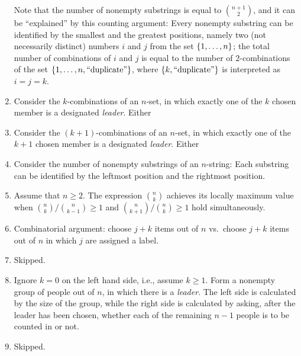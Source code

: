 \begin{enumerate}[\thesection-1]
Note that the number of nonempty substrings is equal to ${n + 1 \choose 2}$, and it can be ``explained'' by this counting argument: Every nonempty substring can be identified by the smallest and the greatest positions, namely two (not necessarily distinct) numbers $i$ and $j$ from the set $\left\{1, \ldots, n\right\}$; the total number of combinations of $i$ and $j$ is equal to the number of $2$-combinations of the set $\left\{1, \ldots, n, \mbox{``duplicate''}\right\}$, where $\left\{k, \mbox{``duplicate''}\right\}$ is interpreted as $i = j = k$.
%
\setcounter{enumi}{4}
%
\item Consider the $k$-combinations of an $n$-set, in which exactly one of the $k$ chosen member is a designated \emph{leader}. Either
%
\item Consider the $(k + 1)$-combinations of an $n$-set, in which exactly one of the $k + 1$ chosen member is a designated \emph{leader}. Either
%
\setcounter{enumi}{8}
%
\item Consider the number of nonempty substrings of an $n$-string: Each substring can be identified by the leftmost position and the rightmost position.
%
\item Assume that $n \geq 2$. The expression ${n \choose k}$ achieves its locally maximum value when ${n \choose k} / {n \choose k - 1} \geq 1$ and ${n \choose k + 1} / {n \choose k} \geq 1$ hold simultaneously.
%
\item Combinatorial argument: choose $j + k$ items out of $n$ vs.~choose $j + k$ items out of $n$ in which $j$ are assigned a label.
%
\item Skipped.
%
\setcounter{enumi}{14}
%
\item Ignore $k = 0$ on the left hand side, i.e., assume $k \geq 1$. Form a nonempty group of people out of $n$, in which there is a \emph{leader}. The left side is calculated by the size of the group, while the right side is calculated by asking, after the leader has been chosen, whether each of the remaining $n - 1$ people is to be counted in or not.
%
\item Skipped.
%
\end{enumerate}


